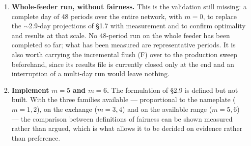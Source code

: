 \documentclass[11pt,a4paper]{article}
\newcommand{\nw}[1]{\textcolor{uaired}{#1}}
\newcommand{\prop}[1]{\textcolor{propblue}{#1}}
\begin{document}
\begin{enumerate}[leftmargin=*,itemsep=3pt]

\item \textbf{Whole-feeder run, without fairness.} This is the validation still missing: a complete
day of 48 periods over the entire network, with $m=0$, to replace the $\sim$2.9-day projections of
\S1.7 with measurement and to confirm optimality and results at that scale. No 48-period run on the
whole feeder has been completed so far; what has been measured are representative periods. It is also
worth carrying the incremental flush \nw{(F)} over to the production sweep beforehand, since its
results file is currently closed only at the end and an interruption of a multi-day run would leave
nothing.

\item \prop{\textbf{Implement $m=5$ and $m=6$.}} \prop{The formulation of \S2.9 is defined but not
built. With the three families available --- proportional to the nameplate (\mbox{$m=1,2$}), on the
exchange (\mbox{$m=3,4$}) and on the available range (\mbox{$m=5,6$}) --- the comparison between
definitions of fairness can be shown measured rather than argued, which is what allows it to be
decided on evidence rather than preference.}

\end{enumerate}
\end{document}

